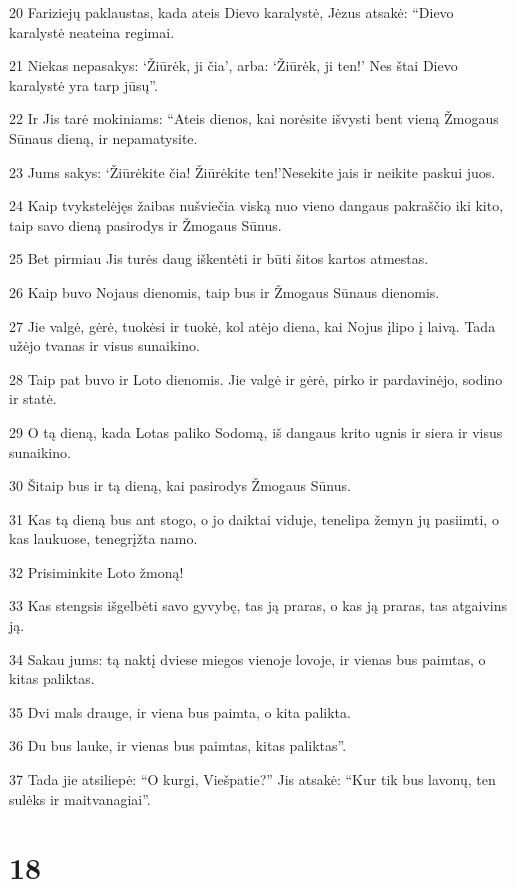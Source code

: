 \par 20 Fariziejų paklaustas, kada ateis Dievo karalystė, Jėzus atsakė: “Dievo karalystė neateina regimai. 
\par 21 Niekas nepasakys: ‘Žiūrėk, ji čia’, arba: ‘Žiūrėk, ji ten!’ Nes štai Dievo karalystė yra tarp jūsų”. 
\par 22 Ir Jis tarė mokiniams: “Ateis dienos, kai norėsite išvysti bent vieną Žmogaus Sūnaus dieną, ir nepamatysite. 
\par 23 Jums sakys: ‘Žiūrėkite čia! Žiūrėkite ten!’­Nesekite jais ir neikite paskui juos. 
\par 24 Kaip tvykstelėjęs žaibas nušviečia viską nuo vieno dangaus pakraščio iki kito, taip savo dieną pasirodys ir Žmogaus Sūnus. 
\par 25 Bet pirmiau Jis turės daug iškentėti ir būti šitos kartos atmestas. 
\par 26 Kaip buvo Nojaus dienomis, taip bus ir Žmogaus Sūnaus dienomis. 
\par 27 Jie valgė, gėrė, tuokėsi ir tuokė, kol atėjo diena, kai Nojus įlipo į laivą. Tada užėjo tvanas ir visus sunaikino. 
\par 28 Taip pat buvo ir Loto dienomis. Jie valgė ir gėrė, pirko ir pardavinėjo, sodino ir statė. 
\par 29 O tą dieną, kada Lotas paliko Sodomą, iš dangaus krito ugnis ir siera ir visus sunaikino. 
\par 30 Šitaip bus ir tą dieną, kai pasirodys Žmogaus Sūnus. 
\par 31 Kas tą dieną bus ant stogo, o jo daiktai viduje, tenelipa žemyn jų pasiimti, o kas laukuose, tenegrįžta namo. 
\par 32 Prisiminkite Loto žmoną! 
\par 33 Kas stengsis išgelbėti savo gyvybę, tas ją praras, o kas ją praras, tas atgaivins ją. 
\par 34 Sakau jums: tą naktį dviese miegos vienoje lovoje, ir vienas bus paimtas, o kitas paliktas. 
\par 35 Dvi mals drauge, ir viena bus paimta, o kita palikta. 
\par 36 Du bus lauke, ir vienas bus paimtas, kitas paliktas”. 
\par 37 Tada jie atsiliepė: “O kurgi, Viešpatie?” Jis atsakė: “Kur tik bus lavonų, ten sulėks ir maitvanagiai”.



\chapter{18}


